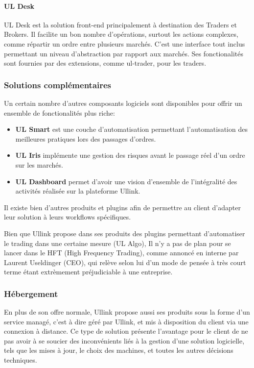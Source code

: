\documentclass[a4paper, 12pt]{article}
\begin{document}
\paragraph{UL Desk}
UL Desk est la solution front-end principalement à destination des Traders et Brokers. Il facilite un bon nombre d'opérations, surtout les actions complexes, comme répartir un ordre entre plusieurs marchés. C'est une interface tout inclus permettant un niveau d'abstraction par rapport aux marchés. Ses fonctionalités sont fournies par des extensions, comme ul-trader, pour les traders.

\subsubsection{Solutions complémentaires}
Un certain nombre d'autres composants logiciels sont disponibles pour offrir un ensemble de fonctionalités plus riche:

\begin{itemize}
\item{{\bf UL Smart} est une couche d'automatisation permettant l'automatisation des meilleures pratiques lors des passages d'ordres.}
\item{{\bf UL Iris} implémente une gestion des risques avant le passage réel d'un ordre sur les marchés.}
\item{{\bf UL Dashboard} permet d'avoir une vision d'ensemble de l'intégralité des activités réalisée sur la plateforme Ullink.}
\end{itemize}

Il existe bien d'autres produits et plugins afin de permettre au client d'adapter leur solution à leurs workflows spécifiques.

Bien que Ullink propose dans ses produits des plugins permettant d'automatiser le trading dans une certaine mesure (UL Algo), Il n'y a pas de plan pour se lancer dans le HFT (High Frequency Trading), comme annoncé en interne par Laurent Useldinger (CEO), qui relève selon lui d'un mode de pensée à très court terme étant extrèmement préjudiciable à une entreprise.

\subsubsection{Hébergement}

En plus de son offre normale, Ullink propose aussi ses produits sous la forme d'un service managé, c'est à dire géré par Ullink, et mis à disposition du client via une connexion à distance. Ce type de solution présente l'avantage pour le client de ne pas avoir à se soucier des inconvénients liés à la gestion d'une solution logicielle, tels que les mises à jour, le choix des machines, et toutes les autres décisions techniques.
\end{document}

